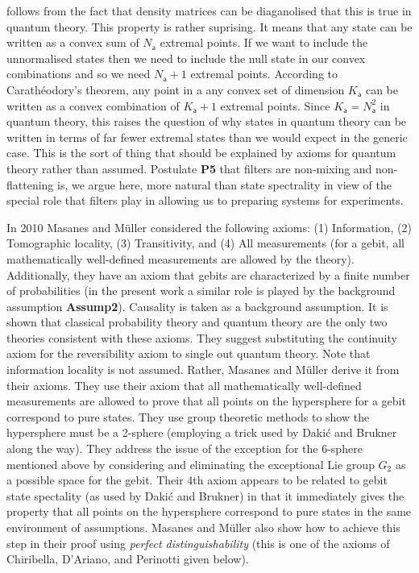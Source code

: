 \documentclass[10pt]{article}
\begin{document}
follows from the fact that density matrices can be diaganolised that this is true in quantum theory.  This property is rather suprising.  It means that any state can be written as a convex sum of $N_\mathsf{a}$ extremal points.  If we want to include the unnormalised states then we need to include the null state in our convex combinations and so we need $N_\mathsf{a}+1$ extremal points.  According to Carath\'eodory's theorem, any point in a any convex set of dimension $K_\mathsf{a}$ can be written as a convex combination of $K_\mathsf{a}+1$ extremal points.  Since $K_\mathsf{a}=N_\mathsf{a}^2$ in quantum theory, this raises the question of why states in quantum theory can be written in terms of far fewer extremal states than we would expect in the generic case.  This is the sort of thing that should be explained by axioms for quantum theory rather than assumed.  Postulate {\bf P5} that filters are non-mixing and non-flattening is, we argue here, more natural than state spectrality in view of the special role that filters play in allowing us to preparing systems for experiments.

In 2010 Masanes and M\"uller \cite{masanes2010derivation} considered the following axioms: (1) Information, (2) Tomographic locality, (3) Transitivity, and (4) All measurements (for a gebit, all mathematically well-defined measurements are allowed by the theory). Additionally, they have an axiom that gebits are characterized by a finite number of probabilities (in the present work a similar role is played by the background assumption {\bf Assump2}).  Causality is taken as a background assumption.  It is shown that classical probability theory and quantum theory are the only two theories consistent with these axioms.  They suggest substituting the continuity axiom for the reversibility axiom to single out quantum theory.  Note that information locality is not assumed.  Rather, Masanes and M\"uller derive it from their axioms. They use their axiom that all mathematically well-defined measurements are allowed to prove that all points on the hypersphere for a gebit correspond to pure states.   They use group theoretic methods to show the hypersphere must be a 2-sphere (employing a trick used by Daki\'c and Brukner along the way).  They address the issue of the exception for the 6-sphere mentioned above by considering and eliminating the exceptional Lie group $G_2$ as a possible space for the gebit.  Their 4th axiom appears to be related to gebit state spectality (as used by Daki\'c and Brukner) in that it immediately gives the property that all points on the hypersphere correspond to pure states in the same environment of assumptions.  Masanes and M\"uller also show how to achieve this step in their proof using \emph{perfect distinguishability} (this is one of the axioms of Chiribella, D'Ariano, and Perinotti given below).
\end{document}
